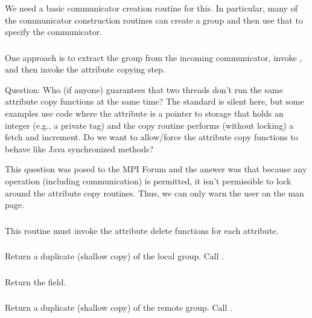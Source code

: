 \documentclass{article}
\begin{document}
\subsubsection{}
We need a basic communicator creation routine for this.  In
particular, many of the communicator construction routines can create
a group and then use that to specify the communicator.  

\subsubsection{}
One approach is to extract the group from the incoming communicator,
invoke , and then invoke the attribute
copying step.

Question: Who (if anyone) guarantees that two threads don't run the same
attribute copy functions at the same time?  The standard is silent here, but
some examples use code where the attribute is a pointer to storage that holds
an integer (e.g., a private tag) and the copy routine performs (without
locking) a fetch and increment.  Do we want to allow/force the attribute copy
functions to behave like Java synchronized methods?

This question was posed to the MPI Forum and the answer was that
because any operation (including communication) is permitted, it isn't
permissible to lock around the attribute copy routines.  Thus, we can
only warn the user on the man page.

\subsubsection{}
This routine must invoke the attribute delete functions for each attribute.

\subsubsection{}
\begin{adi3}Return a duplicate (shallow copy) of the local group.  Call
  . 
\end{adi3}

\subsubsection{}
Return the  field.

\subsubsection{}
\begin{adi3}Return a duplicate (shallow copy) of the remote group.  Call
  . 
\end{adi3}
\end{document}
